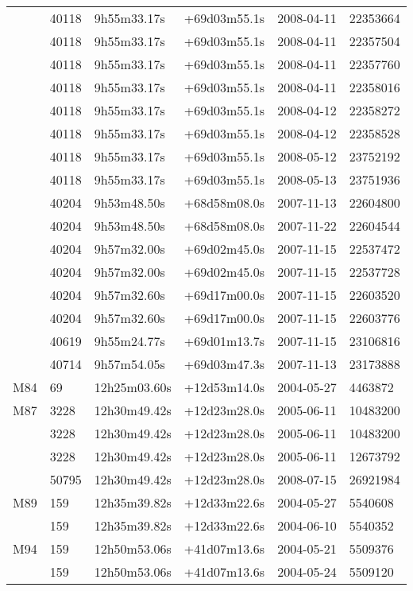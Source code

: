 \begin{table*}
\begin{center}
\begin{tabular}{llllll}
   & 40118 & 9h55m33.17s & +69d03m55.1s & 2008-04-11 & 22353664\\
   & 40118 & 9h55m33.17s & +69d03m55.1s & 2008-04-11 & 22357504\\
   & 40118 & 9h55m33.17s & +69d03m55.1s & 2008-04-11 & 22357760\\
   & 40118 & 9h55m33.17s & +69d03m55.1s & 2008-04-11 & 22358016\\
   & 40118 & 9h55m33.17s & +69d03m55.1s & 2008-04-12 & 22358272\\
   & 40118 & 9h55m33.17s & +69d03m55.1s & 2008-04-12 & 22358528\\
   & 40118 & 9h55m33.17s & +69d03m55.1s & 2008-05-12 & 23752192\\
   & 40118 & 9h55m33.17s & +69d03m55.1s & 2008-05-13 & 23751936\\
   & 40204 & 9h53m48.50s & +68d58m08.0s & 2007-11-13 & 22604800\\
   & 40204 & 9h53m48.50s & +68d58m08.0s & 2007-11-22 & 22604544\\
   & 40204 & 9h57m32.00s & +69d02m45.0s & 2007-11-15 & 22537472\\
   & 40204 & 9h57m32.00s & +69d02m45.0s & 2007-11-15 & 22537728\\
   & 40204 & 9h57m32.60s & +69d17m00.0s & 2007-11-15 & 22603520\\
   & 40204 & 9h57m32.60s & +69d17m00.0s & 2007-11-15 & 22603776\\
   & 40619 & 9h55m24.77s & +69d01m13.7s & 2007-11-15 & 23106816\\
   & 40714 & 9h57m54.05s & +69d03m47.3s & 2007-11-13 & 23173888\\
  M84 & 69 & 12h25m03.60s & +12d53m14.0s & 2004-05-27 & 4463872\\
  M87 & 3228 & 12h30m49.42s & +12d23m28.0s & 2005-06-11 & 10483200\\
   & 3228 & 12h30m49.42s & +12d23m28.0s & 2005-06-11 & 10483200\\
   & 3228 & 12h30m49.42s & +12d23m28.0s & 2005-06-11 & 12673792\\
   & 50795 & 12h30m49.42s & +12d23m28.0s & 2008-07-15 & 26921984\\
  M89 & 159 & 12h35m39.82s & +12d33m22.6s & 2004-05-27 & 5540608\\
   & 159 & 12h35m39.82s & +12d33m22.6s & 2004-06-10 & 5540352\\
  M94 & 159 & 12h50m53.06s & +41d07m13.6s & 2004-05-21 & 5509376\\
   & 159 & 12h50m53.06s & +41d07m13.6s & 2004-05-24 & 5509120\\

\end{tabular}
\end{center}
\end{table*}
